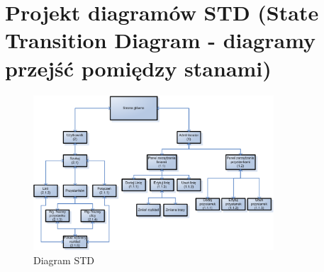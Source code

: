 \section{Projekt diagramów STD (State Transition Diagram - diagramy przejść pomiędzy
stanami)}

\begin{figure}[!htp]
  \centering
  \includegraphics[width=0.8\textwidth]{./img/std.eps}
  \caption{Diagram STD}
  \label{fig:scr3}
\end{figure}

\newpage
